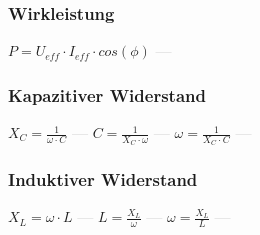 \subsubsection{Wirkleistung} 
\begin{minipage}{0.45\textwidth} 
\end{minipage} 
\begin{minipage}{0.45\textwidth} 
 
\end{minipage} 
$ P = U_{eff}\cdot I_{eff}\cdot cos(\phi ) $ \textcolor{lightgray}{\textbf{---}} 

\subsubsection{Kapazitiver Widerstand} 
\begin{minipage}{0.45\textwidth} 
\end{minipage} 
\begin{minipage}{0.45\textwidth} 
 
\end{minipage} 
$ X_{C} = \frac{ 1}{\omega \cdot C} $ \textcolor{lightgray}{\textbf{---}} 
$ C = \frac{ 1}{X_{C} \cdot \omega } $ \textcolor{lightgray}{\textbf{---}} 
$ \omega = \frac{ 1}{X_{C} \cdot C} $ \textcolor{lightgray}{\textbf{---}} 

\subsubsection{Induktiver Widerstand} 
\begin{minipage}{0.45\textwidth} 
\end{minipage} 
\begin{minipage}{0.45\textwidth} 
 
\end{minipage} 
$ X_{L} =\omega \cdot L $ \textcolor{lightgray}{\textbf{---}} 
$ L = \frac{X_{L} }{\omega } $ \textcolor{lightgray}{\textbf{---}} 
$ \omega =\frac{X_{L} }{L} $ \textcolor{lightgray}{\textbf{---}} 


